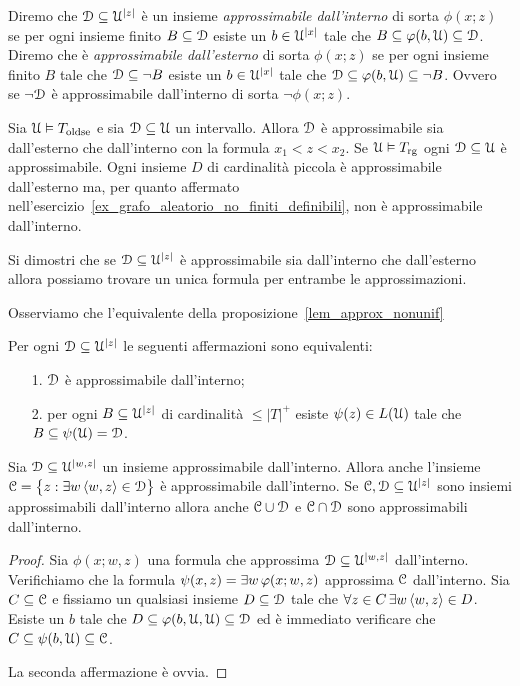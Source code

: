 Diremo che $\EuScript D\subseteq\EuScript U^{|z|}$ \`e un insieme \emph{approssimabile dall'interno\/} di sorta $\phi(x;z)$ se per ogni insieme finito $B\subseteq\EuScript D$ esiste un $b\in\EuScript U^{|x|}$ tale che $B\subseteq\varphi(b,\EuScript U)\subseteq\EuScript D$. Diremo che \`e \emph{approssimabile dall'esterno\/} di sorta $\phi(x;z)$ se per ogni insieme finito $B$ tale che $\EuScript D\subseteq\neg B$ esiste un $b\in\EuScript U^{|x|}$ tale che $\EuScript D\subseteq\varphi(b,\EuScript U)\subseteq\neg B$. Ovvero se $\neg\EuScript D$ \`e approssimabile dall'interno di sorta $\neg\phi(x;z)$. %

\begin{example}
Sia $\EuScript U\vDash T_{\rm oldse}$ e sia $\EuScript D\subseteq\EuScript U$ un intervallo. Allora $\EuScript D$ \`e approssimabile sia dall'esterno che dall'interno con la formula $x_1<z<x_2$.  Se $\EuScript U\vDash T_{\rm rg}$ ogni $\EuScript D\subseteq\EuScript U$ \`e approssimabile. Ogni insieme $D$ di cardinalit\`a piccola \`e approssimabile dall'esterno ma, per quanto affermato nell'esercizio~\ref{ex_grafo_aleatorio_no_finiti_definibili}, non \`e approssimabile dall'interno.\QED
\end{example}

\begin{exercise}
Si dimostri che se $\EuScript D\subseteq\EuScript U^{|z|}$ \`e approssimabile sia dall'interno che dall'esterno allora possiamo trovare un unica formula per entrambe le approssimazioni.\QED 
\end{exercise}

Osserviamo che l'equivalente della proposizione~\ref{lem_approx_nonunif}

\begin{proposition}\label{lem_approx_int_nonunif}
Per ogni $\EuScript D\subseteq\EuScript U^{|z|}$ le seguenti affermazioni sono equivalenti:
\begin{itemize}
\item[1.] $\EuScript D$ \`e approssimabile dall'interno;
\item[2.] per ogni $B\subseteq\EuScript U^{|z|}$ di cardinalit\`a $\le|T|^+$ esiste $\psi(z)\in L(\EuScript U)$ tale che $B\subseteq\psi(\EuScript U)=\EuScript D$.
\end{itemize}
\end{proposition}

\begin{proposition}\label{coroll_proj_approx}
Sia $\EuScript D\subseteq\EuScript U^{|w,z|}$ un insieme approssimabile dall'interno. Allora anche l'insieme $\EuScript C=\big\{z: \exists w\, \langle w,z\rangle\in\EuScript D\big\}$ \`e approssimabile dall'interno. Se $\EuScript C,\EuScript D\subseteq\EuScript U^{|z|}$ sono insiemi approssimabili dall'interno allora anche $\EuScript C\cup\EuScript D$ e  $\EuScript C\cap\EuScript D$ sono approssimabili dall'interno.
\end{proposition}
\begin{proof}
Sia $\phi(x;w,z)$ una formula che approssima $\EuScript D\subseteq\EuScript U^{|w,z|}$ dall'interno. Verifichiamo che la formula $\psi(x,z)=\exists w\,\varphi(x;w,z)$ approssima $\EuScript C$ dall'interno. Sia $C\subseteq\EuScript C$ e fissiamo un qualsiasi insieme $D\subseteq\EuScript D$ tale che $\forall z\in C\,\exists w\,\langle w,z\rangle\in D$. Esiste un $b$ tale che $D\subseteq \varphi(b,\EuScript U,\EuScript U)\subseteq\EuScript D$ ed \`e immediato verificare che $C\subseteq \psi(b,\EuScript U)\subseteq\EuScript C$.

La seconda affermazione \`e ovvia.
\end{proof}

